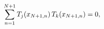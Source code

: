 \[{\sum_{n=1}^{N+1}\mathop{T_{j}\/}\nolimits\!\left(x_{N+1,n}\right)\mathop{T_{k%
}\/}\nolimits\!\left(x_{N+1,n}\right)=0},\]
